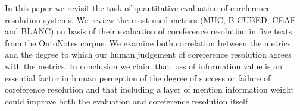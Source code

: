 In this paper we revisit the task of quantitative evaluation of coreference resolution systems. We review the most used metrics (MUC, B-CUBED, CEAF and
 BLANC) on basis of their evaluation of coreference resolution in five texts
 from the OntoNotes corpus. We examine both correlation between the metrics and
 the degree to which our human judgement of coreference resolution agrees with
 the metrics. In conclusion we claim that loss of information value is an
 essential factor in human perception of the degree of success or failure of
 coreference resolution and that including a layer of mention information weight
 could improve both the evaluation and coreference resolution itself.

